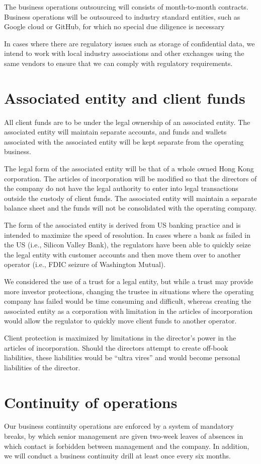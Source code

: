 The business operations outsourcing will consists of month-to-month
contracts.  Business operations will be outsourced to industry
standard entities, such as Google cloud or GitHub, for which no special due diligence is necessary

In cases where there are regulatory issues such as storage of
confidential data, we intend to work with local industry
associations and other exchanges using the same vendors to ensure that
we can comply with regulatory requirements.

\section{Associated entity and client funds}
All client funds are to be under the legal ownership of an associated
entity.  The associated entity will maintain separate accounts, and
funds and wallets associated with the associated entity will be kept
separate from the operating business.

The legal form of the associated entity will be that of a whole owned
Hong Kong corporation.  The articles of incorporation will be modified
so that the directors of the company do not have the legal authority
to enter into legal transactions outside the custody of client
funds.  The associated entity will maintain a separate balance sheet
and the funds will not be consolidated with the operating company.

The form of the associated entity is derived from US banking practice
and is intended to maximize the speed of resolution.  In cases where a
bank as failed in the US (i.e., Silicon Valley Bank), the regulators
have been able to quickly seize the legal entity with customer
accounts and then move them over to another operator (i.e., FDIC
seizure of Washington Mutual).

We considered the use of a trust for a legal entity, but while a trust
may provide more investor protections, changing the trustee in
situations where the operating company has failed would be time
consuming and difficult, whereas creating the associated entity as a
corporation with limitation in the articles of incorporation would
allow the regulator to quickly move client funds to another operator.

Client protection is maximized by limitations in the director's power
in the articles of incorporation.  Should the directors attempt to
create off-book liabilities, these liabilities would be ``ultra
vires'' and would become personal liabilities of the director.

\section{Continuity of operations}
Our business continuity operations are enforced by a system of
mandatory breaks, by which senior management are given two-week leaves
of absences in which contact is forbidden between management and the
company.  In addition, we will conduct a business continuity drill at
least once every six months.

